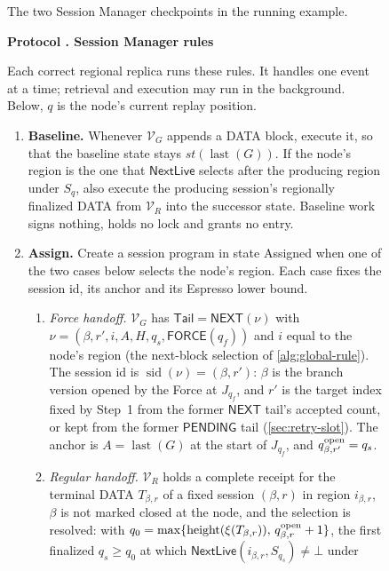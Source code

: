 \documentclass[11pt,a4paper]{article}
\newcommand{\tagg}[1]{\ensuremath{\mathsf{#1}}}
\newcounter{protocol}
\newenvironment{protocol}[3][htbp]{\begin{figure}[#1]\refstepcounter{protocol}\label{#2}
\begin{mdframed}[linewidth=.6pt,skipabove=0pt,skipbelow=0pt,
innertopmargin=7pt,innerbottommargin=7pt]\small
\textbf{Protocol \theprotocol. #3}\par\smallskip}{\end{mdframed}\end{figure}}
\begin{document}
\begin{figure}[htbp]\centering

\caption{The two Session Manager checkpoints in the running example.}
\label{fig:manager-baselines}
\end{figure}

\begin{protocol}[H]{alg:rotation}{Session Manager rules}
Each correct regional replica runs these rules. It handles one event at
a time; retrieval and execution may run in the background. Below, $q$
is the node's current replay position.
\begin{enumerate}[label=\textbf{\arabic*)},itemsep=3pt]
\item \textbf{Baseline.} Whenever $\mathcal V_G$ appends a DATA block,
execute it, so that the baseline state stays
$\mathit{st}(\operatorname{last}(G))$. If the node's region is the one
that $\tagg{NextLive}$ selects after the producing region under $S_q$,
also execute the producing session's regionally finalized DATA from
$\mathcal V_R$ into the successor state. Baseline work signs nothing,
holds no lock and grants no entry.
\item \textbf{Assign.} Create a session program in state Assigned when
one of the two cases below selects the node's region. Each case fixes
the session id, its anchor and its Espresso lower bound.
 \begin{enumerate}[label=(\alph*),itemsep=2pt]
 \item \emph{Force handoff.} $\mathcal V_G$ has
 $\mathsf{Tail}=\tagg{NEXT}(\nu)$ with
 $\nu=(\beta,r',i,A,H,q_s,\tagg{FORCE}(q_f))$ and $i$ equal to the
 node's region (the next-block selection of \cref{alg:global-rule}). The session id is
 $\operatorname{sid}(\nu)=(\beta,r')$: $\beta$ is the branch version
 opened by the Force at $J_{q_f}$, and $r'$ is the target index fixed by
 Step~1 from the former $\tagg{NEXT}$ tail's accepted count, or kept from
 the former $\tagg{PENDING}$ tail (\cref{sec:retry-slot}). The anchor is
 $A=\operatorname{last}(G)$ at the start of $J_{q_f}$, and
 $q^{\rm open}_{\beta,r'}=q_s$.
 \item \emph{Regular handoff.} $\mathcal V_R$ holds a complete receipt
 for the terminal DATA $T_{\beta,r}$ of a fixed session $(\beta,r)$ in
 region $i_{\beta,r}$, $\beta$ is not marked closed at the node, and the
 selection is resolved: with
 $q_0=\max\{\operatorname{height}(\xi(T_{\beta,r})),\,
 q^{\rm open}_{\beta,r}+1\}$, the first finalized $q_s\ge q_0$ at which
 $\tagg{NextLive}(i_{\beta,r},S_{q_s})\ne\bot$ under

\end{enumerate}
\end{enumerate}
\end{protocol}
\end{document}
